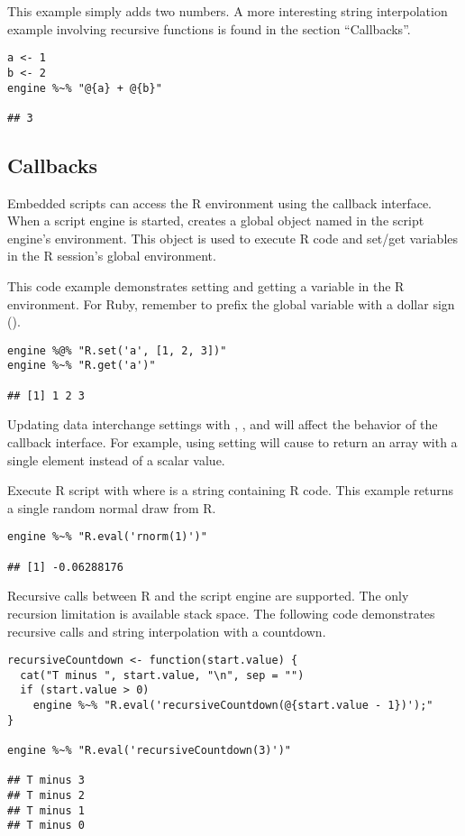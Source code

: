 This example simply adds two numbers. A more interesting string interpolation example involving recursive functions is found in the section “Callbacks”.

\begin{verbatim}
a <- 1
b <- 2
engine %~% "@{a} + @{b}"

## 3
\end{verbatim}

\subsection{Callbacks}

Embedded scripts can access the R environment using the  callback interface. When a script engine is started,  creates a global object named  in the script engine's environment. This object is used to execute R code and set/get variables in the R session's global environment.

This code example demonstrates setting and getting a variable in the R environment. For Ruby, remember to prefix the global variable with a dollar sign ().

\begin{verbatim}
engine %@% "R.set('a', [1, 2, 3])"
engine %~% "R.get('a')"

## [1] 1 2 3
\end{verbatim}

 Updating data interchange settings with , , and  will affect the behavior of the callback interface. For example, using setting  will cause  to return an array with a single element instead of a scalar value.

Execute R script with  where  is a string containing R code. This example returns a single random normal draw from R.

\begin{verbatim}
engine %~% "R.eval('rnorm(1)')"

## [1] -0.06288176
\end{verbatim}

Recursive calls between R and the script engine are supported. The only recursion limitation is available stack space. The following code demonstrates recursive calls and string interpolation with a countdown.

\begin{verbatim}
recursiveCountdown <- function(start.value) {
  cat("T minus ", start.value, "\n", sep = "")
  if (start.value > 0)
    engine %~% "R.eval('recursiveCountdown(@{start.value - 1})');"
}

engine %~% "R.eval('recursiveCountdown(3)')"

## T minus 3
## T minus 2
## T minus 1
## T minus 0
\end{verbatim}

